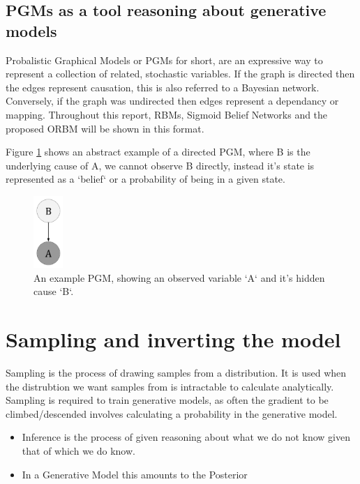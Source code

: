 \subsection{PGMs as a tool reasoning about generative models}
\todo%
Probalistic Graphical Models or PGMs for short, are an expressive way to represent a collection of related, stochastic variables. If the graph is directed then the edges represent causation, this is also referred to a Bayesian network. Conversely, if the graph was undirected then edges represent a dependancy or mapping. Throughout this report, RBMs, Sigmoid Belief Networks and the proposed ORBM will be shown in this format.

Figure \ref{F:PGM-example} shows an abstract example of a directed PGM, where B is the underlying cause of A, we cannot observe B directly, instead it's state is represented as a `belief` or a probability of being in a given state.

\begin{figure}[h]
\begin{center}
  \includegraphics[width = 0.1\textwidth]{Assets/PGM_Example_1.png}
\caption{An example PGM, showing an observed variable `A` and it's hidden cause `B`.}
\label{F:PGM-example}
\end{center}
\end{figure}

\section{Sampling and inverting the model}
Sampling is the process of drawing samples from a distribution. It is used when the distrubtion we want samples from is intractable to calculate analytically. Sampling is required to train generative models, as often the gradient to be climbed/descended involves calculating a probability in the
generative model.
\todo%
\begin{itemize}
  \item Inference is the process of given reasoning about what we do not know given that of which we do know.
  \item In a Generative Model this amounts to the Posterior
\end{itemize}

